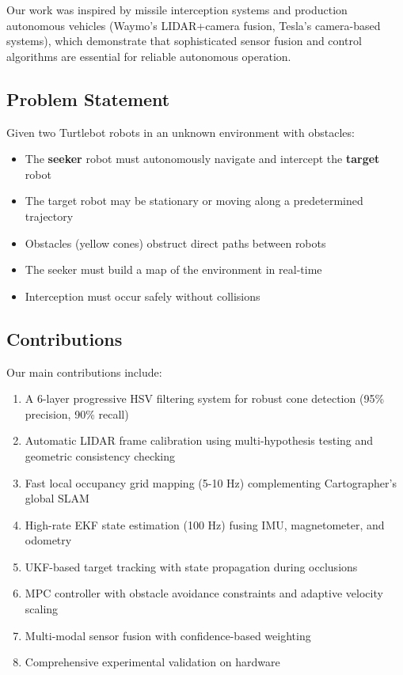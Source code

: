 \documentclass[11pt,a4paper]{article}
\begin{document}
Our work was inspired by missile interception systems and production autonomous vehicles (Waymo's LIDAR+camera fusion, Tesla's camera-based systems), which demonstrate that sophisticated sensor fusion and control algorithms are essential for reliable autonomous operation.

\subsection{Problem Statement}

Given two Turtlebot robots in an unknown environment with obstacles:
\begin{itemize}
    \item The \textbf{seeker} robot must autonomously navigate and intercept the \textbf{target} robot
    \item The target robot may be stationary or moving along a predetermined trajectory
    \item Obstacles (yellow cones) obstruct direct paths between robots
    \item The seeker must build a map of the environment in real-time
    \item Interception must occur safely without collisions
\end{itemize}

\subsection{Contributions}

Our main contributions include:
\begin{enumerate}
    \item A 6-layer progressive HSV filtering system for robust cone detection (95\% precision, 90\% recall)
    \item Automatic LIDAR frame calibration using multi-hypothesis testing and geometric consistency checking
    \item Fast local occupancy grid mapping (5-10 Hz) complementing Cartographer's global SLAM
    \item High-rate EKF state estimation (100 Hz) fusing IMU, magnetometer, and odometry
    \item UKF-based target tracking with state propagation during occlusions
    \item MPC controller with obstacle avoidance constraints and adaptive velocity scaling
    \item Multi-modal sensor fusion with confidence-based weighting
    \item Comprehensive experimental validation on hardware
\end{enumerate}
\end{document}
